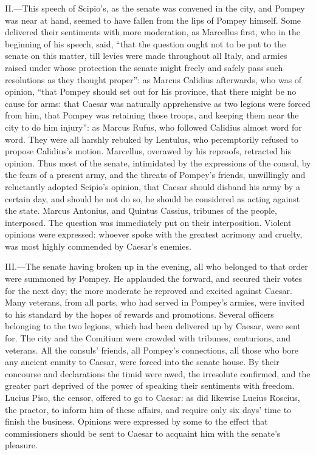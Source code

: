 II.—This speech of Scipio's, as the senate was convened in the city,
and Pompey was near at hand, seemed to have fallen from the lips of
Pompey himself. Some delivered their sentiments with more moderation, as
Marcellus first, who in the beginning of his speech, said, ``that the
question ought not to be put to the senate on this matter, till levies
were made throughout all Italy, and armies raised under whose protection
the senate might freely and safely pass such resolutions as they thought
proper'': as Marcus Calidius afterwards, who was of opinion, ``that Pompey
should set out for his province, that there might be no cause for arms:
that Caesar was naturally apprehensive as two legions were forced from
him, that Pompey was retaining those troops, and keeping them near the
city to do him injury'': as Marcus Rufus, who followed Calidius almost
word for word. They were all harshly rebuked by Lentulus, who
peremptorily refused to propose Calidius's motion. Marcellus, overawed
by his reproofs, retracted his opinion. Thus most of the senate,
intimidated by the expressions of the consul, by the fears of a present
army, and the threats of Pompey's friends, unwillingly and reluctantly
adopted Scipio's opinion, that Caesar should disband his army by a
certain day, and should he not do so, he should be considered as acting
against the state. Marcus Antonius, and Quintus Cassius, tribunes of the
people, interposed. The question was immediately put on their
interposition. Violent opinions were expressed: whoever spoke with the
greatest acrimony and cruelty, was most highly commended by Caesar's
enemies.

III.—The senate having broken up in the evening, all who belonged to
that order were summoned by Pompey. He applauded the forward, and
secured their votes for the next day; the more moderate he reproved and
excited against Caesar. Many veterans, from all parts, who had served in
Pompey's armies, were invited to his standard by the hopes of rewards
and promotions. Several officers belonging to the two legions, which had
been delivered up by Caesar, were sent for. The city and the Comitium
were crowded with tribunes, centurions, and veterans. All the consuls'
friends, all Pompey's connections, all those who bore any ancient enmity
to Caesar, were forced into the senate house. By their concourse and
declarations the timid were awed, the irresolute confirmed, and the
greater part deprived of the power of speaking their sentiments with
freedom. Lucius Piso, the censor, offered to go to Caesar: as did
likewise Lucius Roscius, the praetor, to inform him of these affairs,
and require only six days' time to finish the business. Opinions were
expressed by some to the effect that commissioners should be sent to
Caesar to acquaint him with the senate's pleasure.

